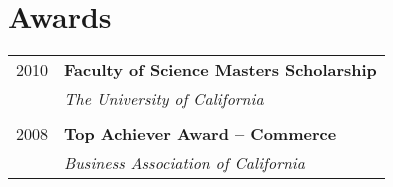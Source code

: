 \documentclass[a4paper,10pt]{article} %
\begin{document}
\begin{minipage}[t]{0.5\textwidth}
\section{Awards} 

\begin{tabular}{rl}
2010	 & \textbf{Faculty of Science Masters Scholarship}\\
& \textit{The University of California}\\ \\

2008	 & \textbf{Top Achiever Award -- Commerce}\\
& \textit{Business Association of California}
\end{tabular}\\[10pt]


\end{minipage} %
\hfill
\end{document}

